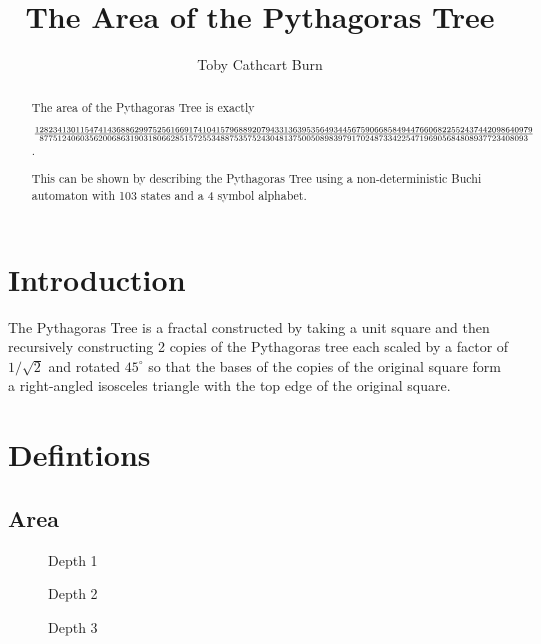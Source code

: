 \documentclass{article}
\author{Toby {Cathcart Burn}}
\title{The Area of the Pythagoras Tree}
\newcommand{\bounding}{
\draw[tsty] (-2.5,1) -- (-1.5,0) -- (2.5,0) -- (3.5,1) -- (3.5,2.5) -- (2,4) -- (-1,4) -- (-2.5, 2.5) -- cycle;
}
\newcommand{\subt}[2]{
    \begin{scope}[yshift=1cm,rotate=45,scale=0.7071]
        #1
    \end{scope}
    \begin{scope}[xshift=0.5cm,yshift=1.5cm,rotate=-45,scale=0.7071]
        #2
    \end{scope}
}
\newcommand{\dup}[1]{\subt{#1}{#1}}
\newcommand{\tree}[1]{
    \fill[tsty] (0,0) -- (1,0) -- (1,1) -- (0,1) -- cycle;
    \ifthenelse{#1<2}{}{
        \dup{\tree{\the\numexpr#1-1}}
    }
}
\begin{document}
\maketitle
\begin{abstract}
The area of the Pythagoras Tree is exactly
    
${12823413011547414368862997525616691741041579688920794331363953564934456759066858494476606822552437442098640979}\over{877512406035620068631903180662851572553488753575243048137500508983979170248733422547196905684808937723408093}$.
    
This can be shown by describing the Pythagoras Tree using a non-deterministic Buchi automaton with 103 states %
and a 4 symbol alphabet.
\end{abstract}
\section{Introduction}\label{sec:intro}
The Pythagoras Tree is a fractal constructed by taking a unit square and then recursively constructing 2 copies of the Pythagoras tree each scaled by a factor of $1/\sqrt{2}$ and rotated $45^\circ$ so that the bases of the copies of the original square form a right-angled isosceles triangle with the top edge of the original square.

\begin{center}
\end{center}
\newpage
\section{Defintions}
\subsection{Area}
\begin{wrapfigure}{l}{1.5cm}
\centering
{}

Depth 1


Depth 2


Depth 3

\end{wrapfigure}
\end{document}
